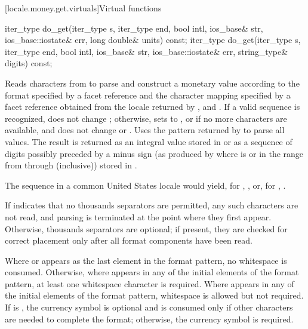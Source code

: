 [locale.money.get.virtuals]{Virtual functions}

%
\begin{itemdecl}
iter_type do_get(iter_type s, iter_type end, bool intl, ios_base& str,
                 ios_base::iostate& err, long double& units) const;
iter_type do_get(iter_type s, iter_type end, bool intl, ios_base& str,
                 ios_base::iostate& err, string_type& digits) const;
\end{itemdecl}

\begin{itemdescr}
\pnum
\effects
Reads characters from  to parse and construct a monetary value
according to the format specified by
a  facet reference 
and the character mapping specified by
a  facet reference 
obtained from the locale returned by , and
.
If a valid sequence is recognized, does not change ;
otherwise, sets  to , or
 if no more characters are available,
and does not change  or .
Uses the pattern returned by  to parse all values.
The result is returned as an integral value stored in 
or as a sequence of digits possibly preceded by a minus sign
(as produced by 
where  is  or
in the range from  through  (inclusive))
stored in .
\begin{example}
The sequence  in a common United States locale would yield,
for , , or,
for , .
\end{example}
If  indicates that no thousands separators are permitted,
any such characters are not read, and
parsing is terminated at the point where they first appear.
Otherwise, thousands separators are optional;
if present, they are checked for correct placement only after
all format components have been read.

\pnum
Where  or 
appears as the last element in the format pattern,
no whitespace is consumed.
Otherwise, where  appears in any of
the initial elements of the format pattern,
at least one whitespace character is required.
Where  appears
in any of the initial elements of the format pattern,
whitespace is allowed but not required.
If  is ,
the currency symbol is optional and
is consumed only if other characters are needed to complete the format;
otherwise, the currency symbol is required.


\end{itemdescr}
